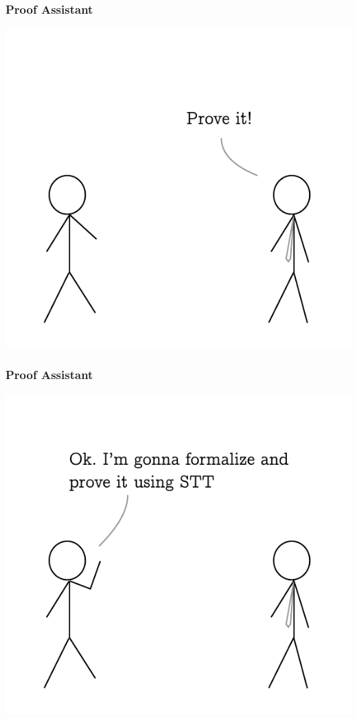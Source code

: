 \documentclass{beamer}
\begin{document}
  \begin{frame}
    \frametitle{Proof Assistant}
    \centering
    \includegraphics[scale=0.8]{images/7.pdf}
  \end{frame}
  \begin{frame}
    \frametitle{Proof Assistant}
    \centering
    \includegraphics[scale=0.8]{images/8.pdf}
  \end{frame}
\end{document}
